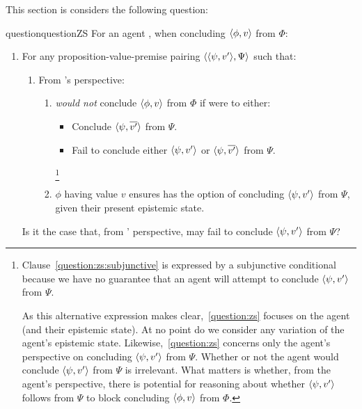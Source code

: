 \begin{note}
  This section is considers the following question:

  \begin{restatable}[\zSN{2}]{question}{questionZS}
    \label{question:zs}
    For an agent \vAgent{}, when concluding \(\langle \phi, v \rangle\) from \(\Phi\):

    \begin{enumerate}[label=\arabic*., ref=(\arabic*)]
    \item
      For any proposition-value-premise pairing \(\langle \langle \psi, v' \rangle, \Psi \rangle\) such that:
    \begin{enumerate}[label=\alph*., ref=(\alph*)]
    \item
      From \vAgent{}'s perspective:
      \begin{enumerate}[label=\roman*., ref=(\roman*)]
      \item
        \label{question:zs:subjunctive}
        \vAgent{} \emph{would not} conclude \(\langle \phi, v \rangle\) from \(\Phi\) if \vAgent{} were to either:
        \begin{itemize}
        \item Conclude \(\langle \psi, \overline{v'} \rangle\) from \(\Psi\).
        \item Fail to conclude either \(\langle \psi, v' \rangle\) or \(\langle \psi, \overline{v'} \rangle\) from \(\Psi\).
        \end{itemize}
        \footnote{
          Clause~\ref{question:zs:subjunctive} is expressed by a subjunctive conditional because we have no guarantee that an agent will attempt to conclude \(\langle \psi, v' \rangle\) from \(\Psi\).

          \color{red}
          As this alternative expression makes clear,~\autoref{question:zs} focuses on the agent (and their epistemic state).
          At no point do we consider any variation of the agent's epistemic state.
          Likewise,~\autoref{question:zs} concerns only the agent's perspective on concluding \(\langle \psi, v' \rangle\) from \(\Psi\).
          Whether or not the agent would conclude \(\langle \psi, v' \rangle\) from \(\Psi\) is irrelevant.
          What matters is whether, from the agent's perspective, there is potential for reasoning about whether \(\langle \psi, v' \rangle\) follows from \(\Psi\) to block concluding \(\langle \phi, v \rangle\) from \(\Phi\).
        }
      \item
        \label{question:zs:option}
        \(\phi\) having value \(v\) ensures \vAgent{} has the option of concluding \(\langle \psi, v' \rangle\) from \(\Psi\), given their present epistemic state.
      \end{enumerate}
    \end{enumerate}
      \label{question:zs:may-fail}
      Is it the case that, from \vAgent{}' perspective, \vAgent{} may fail to conclude \(\langle \psi, v' \rangle\) from \(\Psi\)?
    \end{enumerate}
    \vspace{-\baselineskip}
  \end{restatable}


\end{note}
